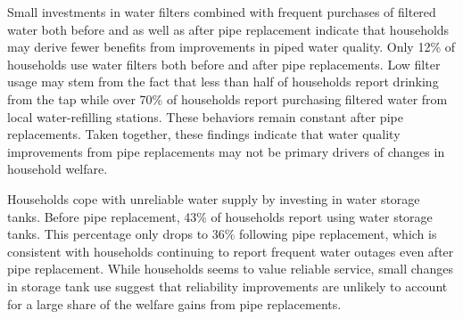 \documentclass[12pt,table]{article}
\begin{document}

Small investments in water filters combined with frequent purchases of filtered water both before and as well as after pipe replacement indicate that households may derive fewer benefits from improvements in piped water quality.  Only 12\% of households use water filters both before and after pipe replacements.  Low filter usage may stem from the fact that less than half of households report drinking from the tap while over 70\% of households report purchasing filtered water from local water-refilling stations.  These behaviors remain constant after pipe replacements.  Taken together, these findings indicate that water quality improvements from pipe replacements may not be primary drivers of changes in household welfare.

Households cope with unreliable water supply by investing in water storage tanks.  Before pipe replacement, 43\% of households report using water storage tanks.  This percentage only drops to 36\% following pipe replacement, which is consistent with households continuing to report frequent water outages even after pipe replacement.  While households seems to value reliable service, small changes in storage tank use suggest that reliability improvements are unlikely to account for a large share of the welfare gains from pipe replacements.
\end{document}
